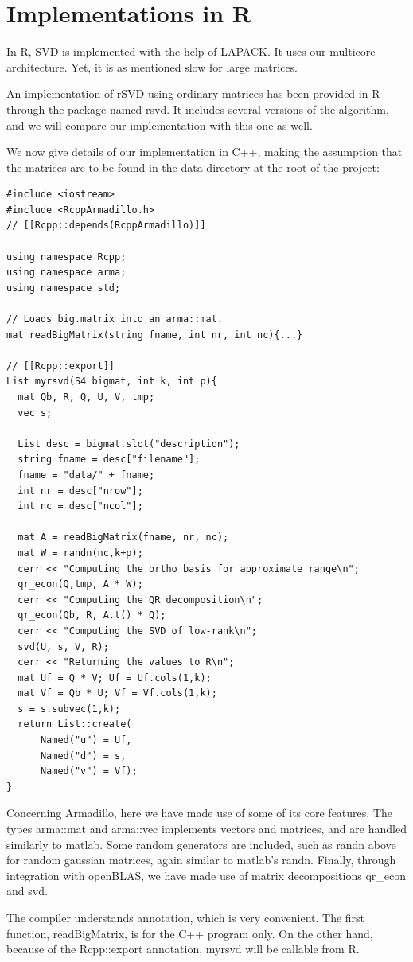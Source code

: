 \documentclass[a4paper,11pt]{amsart}
\begin{document}
\section{Implementations in R}
In R, SVD is implemented with the help of LAPACK. It uses our multicore architecture. Yet, it is as mentioned slow for large matrices.

An implementation of rSVD using ordinary matrices has been provided in R through the package named rsvd. It includes several versions of the algorithm, and we will compare our implementation with this one as well.

We now give details of our implementation in C++, making the assumption that the matrices are to be found in the data directory at the root of the project:
\begin{verbatim}
#include <iostream>
#include <RcppArmadillo.h>
// [[Rcpp::depends(RcppArmadillo)]]

using namespace Rcpp;
using namespace arma;
using namespace std;

// Loads big.matrix into an arma::mat.
mat readBigMatrix(string fname, int nr, int nc){...}

// [[Rcpp::export]]
List myrsvd(S4 bigmat, int k, int p){
  mat Qb, R, Q, U, V, tmp;
  vec s;

  List desc = bigmat.slot("description");
  string fname = desc["filename"];
  fname = "data/" + fname;
  int nr = desc["nrow"];
  int nc = desc["ncol"];

  mat A = readBigMatrix(fname, nr, nc);
  mat W = randn(nc,k+p);
  cerr << "Computing the ortho basis for approximate range\n";
  qr_econ(Q,tmp, A * W);
  cerr << "Computing the QR decomposition\n";
  qr_econ(Qb, R, A.t() * Q);
  cerr << "Computing the SVD of low-rank\n";
  svd(U, s, V, R);
  cerr << "Returning the values to R\n";
  mat Uf = Q * V; Uf = Uf.cols(1,k);
  mat Vf = Qb * U; Vf = Vf.cols(1,k);
  s = s.subvec(1,k);
  return List::create(
      Named("u") = Uf,
      Named("d") = s,
      Named("v") = Vf);
}
\end{verbatim}

Concerning Armadillo, here we have made use of some of its core features. The types arma::mat and arma::vec implements vectors and matrices, and are handled similarly to matlab. Some random generators are included, such as randn above for random gaussian matrices, again similar to matlab's randn. Finally, through integration with openBLAS, we have made use of matrix decompositions qr\_econ and svd. 

The compiler understands annotation, which is very convenient. The first function, readBigMatrix, is for the C++ program only. On the other hand, because of the Rcpp::export annotation, myrsvd will be callable from R. 
\end{document}
